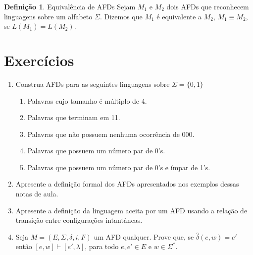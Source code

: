 \documentclass[a4paper]{article}
\theoremstyle{definition}
\newtheorem{Definition}{Definição}
\begin{document}
  \begin{Definition}{Equivalência de AFDs}
    Sejam $M_1$ e $M_2$ dois AFDs que reconhecem linguagens sobre um alfabeto
    $\Sigma$. Dizemos que $M_1$ é equivalente a $M_2$, $M_1 \equiv M_2$, se
    $L(M_1) = L(M_2)$.
  \end{Definition}
  
  \section{Exercícios}

  \begin{enumerate}
    \item Construa AFDs para as seguintes linguagens sobre $\Sigma = \{0,1\}$
      \begin{enumerate}
        \item Palavras cujo tamanho é múltiplo de 4.
        \item Palavras que terminam em 11.
        \item Palavras que não possuem nenhuma ocorrência de 000.
        \item Palavras que possuem um número par de 0's.
        \item Palavras que possuem um número par de 0's e ímpar de 1's.
      \end{enumerate}
    \item Apresente a definição formal dos AFDs apresentados nos exemplos dessas
      notas de aula.
    \item Apresente a definição da linguagem aceita por um AFD usando a relação
      de transição entre configurações intantâneas.
    \item Seja $M = (E,\Sigma,\delta,i,F)$ um AFD qualquer. Prove que,
      se $\widehat{\delta}(e,w) = e'$ então $[e,w]\vdash[e',\lambda]$, para todo
         $e,e' \in E$ e $w \in \Sigma^*$.
  \end{enumerate}
\end{document}
